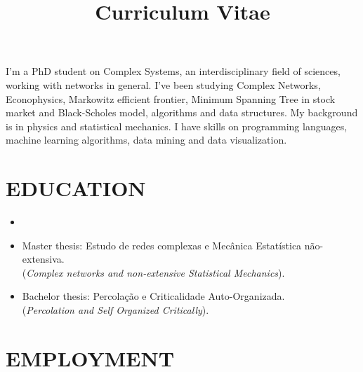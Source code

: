 \documentclass[12pt,a4paper,roman]{moderncv}        %
\title{Curriculum Vitae}                               %
\begin{document}
\makecvtitle

\small{I'm a PhD student on Complex Systems, an interdisciplinary field of sciences, working with networks in general. I've been studying Complex Networks, Econophysics, Markowitz efficient frontier, Minimum Spanning Tree in stock market and Black-Scholes model, algorithms and data structures. My background is in physics and statistical mechanics. I have skills on programming languages, machine learning algorithms, data mining and data visualization.}

\section{EDUCATION}

\vspace{5pt}

\begin{itemize}

\item{}

\item{Master thesis: Estudo de redes complexas e Mecânica Estatística não-extensiva.\\(\textit{Complex networks and non-extensive Statistical Mechanics}).}  %

\item{Bachelor thesis: Percolação e Criticalidade Auto-Organizada.\\(\textit{Percolation and Self Organized Critically}).}  %

\end{itemize}
\section{EMPLOYMENT}
\end{document}
